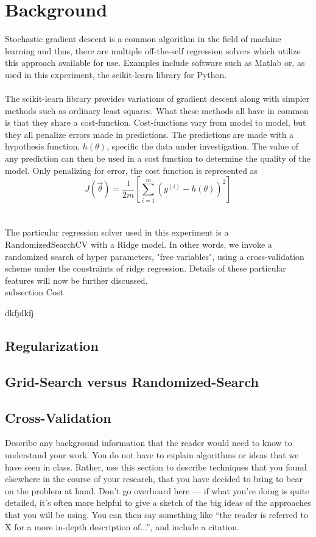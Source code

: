
\section{Background}
\label{sec:background}

Stochastic gradient descent is a common algorithm in the field of machine
learning and thus, there are multiple off-the-self regression solvers which
utilize this approach available for use. Examples include software 
such as Matlab or, as used in this experiment, the scikit-learn library for Python.
\\ \\
The scikit-learn library provides variations of gradient descent along with 
simpler methods such as ordinary least squares. What these methods all
have in common is that they share a cost-function. Cost-functions vary from
model to model, but they all penalize errors made in predictions. The predictions
are made with a hypothesis function, $h(\theta)$, specific the data under
investigation. The value of any prediction can then be used in a cost function
to determine the quality of the model. Only penalizing for error, the cost function
is represented as $$J(\vec{\theta}) = \frac{1}{2m} [\sum_{i = 1}^{m} (y^(i) - h(\theta))^2]$$
\\ \\
The particular regression solver used in this experiment is a RandomizedSearchCV 
with a Ridge model. In other words, we invoke a randomized search of hyper parameters, "free variables", using a cross-validation scheme under the constraints of ridge regression. 
Details of these particular features will now be further discussed.
\\
subsection {Cost}


dkfjdkfj


\subsection{Regularization}



\subsection{Grid-Search versus Randomized-Search}

\subsection{Cross-Validation}


Describe any background information that the reader would need to know
to understand your work. You do not have to explain algorithms or
ideas that we have seen in class. Rather, use this section to describe
techniques that you found elsewhere in the course of your research,
that you have decided to bring to bear on the problem at hand. Don't
go overboard here --- if what you're doing is quite detailed, it's
often more helpful to give a sketch of the big ideas of the approaches
that you will be using. You can then say something like ``the reader
is referred to X for a more in-depth description of...'', and include
a citation.\\

